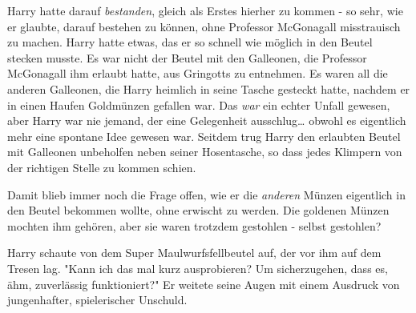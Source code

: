 Harry hatte darauf \emph{bestanden}, gleich als Erstes hierher zu kommen - so sehr, wie er glaubte, darauf bestehen zu können, ohne Professor McGonagall misstrauisch zu machen. Harry hatte etwas, das er so schnell wie möglich in den Beutel stecken musste. Es war nicht der Beutel mit den Galleonen, die Professor McGonagall ihm erlaubt hatte, aus Gringotts zu entnehmen. Es waren all die anderen Galleonen, die Harry heimlich in seine Tasche gesteckt hatte, nachdem er in einen Haufen Goldmünzen gefallen war. Das \emph{war} ein echter Unfall gewesen, aber Harry war nie jemand, der eine Gelegenheit ausschlug… obwohl es eigentlich mehr eine spontane Idee gewesen war. Seitdem trug Harry den erlaubten Beutel mit Galleonen unbeholfen neben seiner Hosentasche, so dass jedes Klimpern von der richtigen Stelle zu kommen schien. 

Damit blieb immer noch die Frage offen, wie er die \emph{anderen} Münzen eigentlich in den Beutel bekommen wollte, ohne erwischt zu werden. Die goldenen Münzen mochten ihm gehören, aber sie waren trotzdem gestohlen - selbst gestohlen? 

Harry schaute von dem Super Maulwurfsfellbeutel  auf, der vor ihm auf dem Tresen lag. "Kann ich das mal kurz ausprobieren? Um sicherzugehen, dass es, ähm, zuverlässig funktioniert?" Er weitete seine Augen mit einem Ausdruck von jungenhafter, spielerischer Unschuld. 


